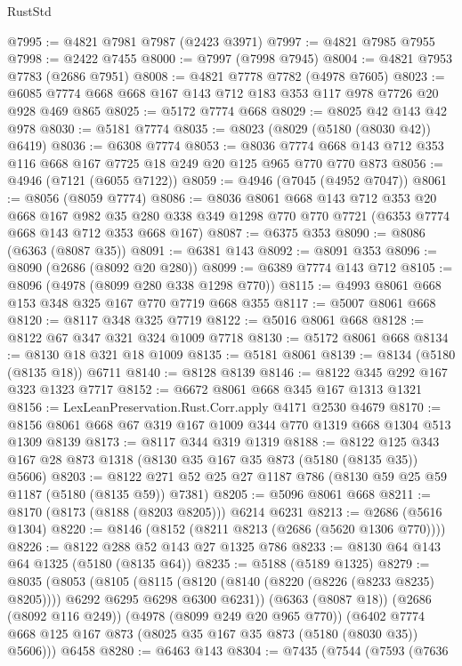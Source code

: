 \begin{lexlean}{RustStd}
\begin{coremodule}
@7995 := @4821 @7981 @7987 (@2423 @3971)
@7997 := @4821 @7985 @7955
@7998 := @2422 @7455
@8000 := @7997 (@7998 @7945)
@8004 := @4821 @7953 @7783 (@2686 @7951)
@8008 := @4821 @7778 @7782 (@4978 @7605)
@8023 := @6085 @7774 @668 @668 @167 @143 @712 @183 @353 @117 @978 @7726 @20 @928 @469 @865
@8025 := @5172 @7774 @668
@8029 := @8025 @42 @143 @42 @978
@8030 := @5181 @7774
@8035 := @8023 (@8029 (@5180 (@8030 @42)) @6419)
@8036 := @6308 @7774
@8053 := @8036 @7774 @668 @143 @712 @353 @116 @668 @167 @7725 @18 @249 @20 @125 @965 @770 @770 @873
@8056 := @4946 (@7121 (@6055 @7122))
@8059 := @4946 (@7045 (@4952 @7047))
@8061 := @8056 (@8059 @7774)
@8086 := @8036
    @8061
    @668
    @143
    @712
    @353
    @20
    @668
    @167
    @982
    @35
    @280
    @338
    @349
    @1298
    @770
    @770
    @7721
    (@6353 @7774 @668 @143 @712 @353 @668 @167)
@8087 := @6375 @353
@8090 := @8086 (@6363 (@8087 @35))
@8091 := @6381 @143
@8092 := @8091 @353
@8096 := @8090 (@2686 (@8092 @20 @280))
@8099 := @6389 @7774 @143 @712
@8105 := @8096 (@4978 (@8099 @280 @338 @1298 @770))
@8115 := @4993 @8061 @668 @153 @348 @325 @167 @770 @7719 @668 @355
@8117 := @5007 @8061 @668
@8120 := @8117 @348 @325 @7719
@8122 := @5016 @8061 @668
@8128 := @8122 @67 @347 @321 @324 @1009 @7718
@8130 := @5172 @8061 @668
@8134 := @8130 @18 @321 @18 @1009
@8135 := @5181 @8061
@8139 := @8134 (@5180 (@8135 @18)) @6711
@8140 := @8128 @8139
@8146 := @8122 @345 @292 @167 @323 @1323 @7717
@8152 := @6672 @8061 @668 @345 @167 @1313 @1321
@8156 := LexLeanPreservation.Rust.Corr.apply @4171 @2530 @4679
@8170 := @8156 @8061 @668 @67 @319 @167 @1009 @344 @770 @1319 @668 @1304 @513 @1309 @8139
@8173 := @8117 @344 @319 @1319
@8188 := @8122 @125 @343 @167 @28 @873 @1318 (@8130 @35 @167 @35 @873 (@5180 (@8135 @35)) @5606)
@8203 := @8122 @271 @52 @25 @27 @1187 @786 (@8130 @59 @25 @59 @1187 (@5180 (@8135 @59)) @7381)
@8205 := @5096 @8061 @668
@8211 := @8170 (@8173 (@8188 (@8203 @8205))) @6214 @6231
@8213 := @2686 (@5616 @1304)
@8220 := @8146 (@8152 (@8211 @8213 (@2686 (@5620 @1306 @770))))
@8226 := @8122 @288 @52 @143 @27 @1325 @786
@8233 := @8130 @64 @143 @64 @1325 (@5180 (@8135 @64))
@8235 := @5188 (@5189 @1325)
@8279 := @8035
    (@8053
      (@8105
        (@8115 (@8120 (@8140 (@8220 (@8226 (@8233 @8235) @8205)))) @6292 @6295 @6298 @6300 @6231))
      (@6363 (@8087 @18))
      (@2686 (@8092 @116 @249))
      (@4978 (@8099 @249 @20 @965 @770))
      (@6402 @7774 @668 @125 @167 @873 (@8025 @35 @167 @35 @873 (@5180 (@8030 @35)) @5606)))
    @6458
@8280 := @6463 @143
@8304 := @7435
    (@7544
      (@7593
        (@7636

\end{coremodule}
\end{lexlean}
